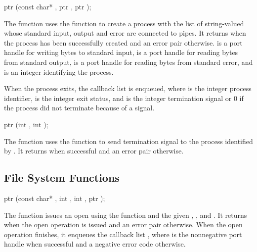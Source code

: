 \begin{function}
  ptr (const char* , ptr , ptr );
\end{function}

The  function uses the  function to
create a process with the list of string-valued  whose
standard input, output and error are connected to pipes.  It returns
 when the process has been successfully created and an
error pair otherwise.   is a port handle for writing
bytes to standard input,  is a port handle for
reading bytes from standard output,  is a port handle
for reading bytes from standard error, and  is an integer
identifying the process.

When the process exits, the callback list  is enqueued, where
 is the integer process identifier,  is the
integer exit status, and  is the integer termination
signal or 0 if the process did not terminate because of a signal.

\begin{function}
  ptr (int , int );
\end{function}

The  function uses the  function to
send termination signal  to the process identified by
. It returns  when successful and an error pair
otherwise.

\subsection {File System Functions}

\begin{function}
  ptr (const char* , int , int , ptr );
\end{function}

The  function issues an open using the
 function and the given , ,
and . It returns  when the open operation is
issued and an error pair otherwise. When the open operation finishes,
it enqueues the callback list ,
where  is the nonnegative port handle when successful and
a negative error code otherwise.

